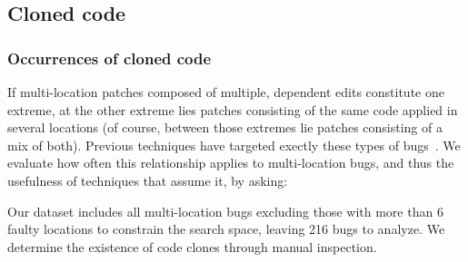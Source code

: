 \documentclass[10pt, conference]{IEEEtran}
\begin{document}
\subsection{Cloned code}
\label{sec:clones}

\subsubsection{Occurrences of cloned code}

If multi-location patches composed of multiple, dependent edits constitute one
extreme, at the other extreme lies patches consisting of the same code applied
in several locations (of course, between those extremes lie patches consisting
of a mix of both). Previous techniques have targeted exectly these types of
bugs~\cite{wang2018,saha2019harnessing}.  We evaluate how often this relationship applies to
multi-location bugs, and thus the usefulness of techniques that assume it, by asking: 



Our dataset includes all multi-location bugs excluding those with more than 6 faulty locations to 
constrain the search space, leaving 216 bugs to analyze. We determine the existence of code 
clones through manual inspection.

\end{document}

